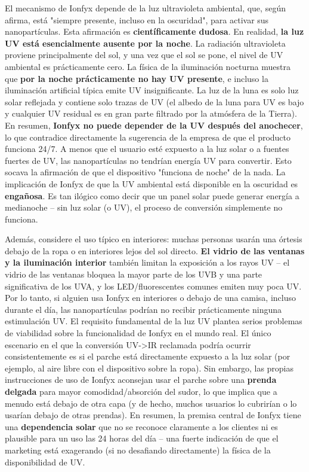 \documentclass{article}
\begin{document}
El mecanismo de Ionfyx depende de la luz ultravioleta ambiental, que, según afirma, está "siempre presente, incluso en la oscuridad", para activar sus nanopartículas. Esta afirmación es \textbf{científicamente dudosa}. En realidad, \textbf{la luz UV está esencialmente ausente por la noche}. La radiación ultravioleta proviene principalmente del sol, y una vez que el sol se pone, el nivel de UV ambiental es prácticamente cero. La física de la iluminación nocturna muestra que \textbf{por la noche prácticamente no hay UV presente}, e incluso la iluminación artificial típica emite UV insignificante. La luz de la luna es solo luz solar reflejada y contiene solo trazas de UV (el albedo de la luna para UV es bajo y cualquier UV residual es en gran parte filtrado por la atmósfera de la Tierra). En resumen, \textbf{Ionfyx no puede depender de la UV después del anochecer}, lo que contradice directamente la sugerencia de la empresa de que el producto funciona 24/7. A menos que el usuario esté expuesto a la luz solar o a fuentes fuertes de UV, las nanopartículas no tendrían energía UV para convertir. Esto socava la afirmación de que el dispositivo "funciona de noche" de la nada. La implicación de Ionfyx de que la UV ambiental está disponible en la oscuridad es \textbf{engañosa}. Es tan ilógico como decir que un panel solar puede generar energía a medianoche – sin luz solar (o UV), el proceso de conversión simplemente no funciona.

Además, considere el uso típico en interiores: muchas personas usarán una órtesis debajo de la ropa o en interiores lejos del sol directo. \textbf{El vidrio de las ventanas y la iluminación interior} también limitan la exposición a los rayos UV – el vidrio de las ventanas bloquea la mayor parte de los UVB y una parte significativa de los UVA, y los LED/fluorescentes comunes emiten muy poca UV. Por lo tanto, si alguien usa Ionfyx en interiores o debajo de una camisa, incluso durante el día, las nanopartículas podrían no recibir prácticamente ninguna estimulación UV. El requisito fundamental de la luz UV plantea serios problemas de viabilidad sobre la funcionalidad de Ionfyx en el mundo real. El único escenario en el que la conversión UV->IR reclamada podría ocurrir consistentemente es si el parche está directamente expuesto a la luz solar (por ejemplo, al aire libre con el dispositivo sobre la ropa). Sin embargo, las propias instrucciones de uso de Ionfyx aconsejan usar el parche sobre una \textbf{prenda delgada} para mayor comodidad/absorción del sudor, lo que implica que a menudo está debajo de otra capa (y de hecho, muchos usuarios lo cubrirían o lo usarían debajo de otras prendas). En resumen, la premisa central de Ionfyx tiene una \textbf{dependencia solar} que no se reconoce claramente a los clientes ni es plausible para un uso las 24 horas del día – una fuerte indicación de que el marketing está exagerando (si no desafiando directamente) la física de la disponibilidad de UV.
\end{document}
